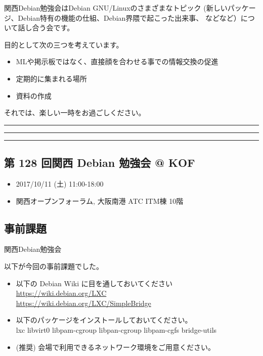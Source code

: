\documentclass[mingoth,a4paper]{jsarticle}
\begin{document}
\vspace{1em}

関西Debian勉強会はDebian GNU/Linuxのさまざまなトピック
(新しいパッケージ、Debian特有の機能の仕組、Debian界隈で起こった出来事、
などなど）について話し合う会です。

目的として次の三つを考えています。
\begin{itemize}
\item MLや掲示板ではなく、直接顔を合わせる事での情報交換の促進
\item 定期的に集まれる場所
\item 資料の作成
\end{itemize}

それでは、楽しい一時をお過ごしください。

\newpage

\begin{minipage}[b]{0.2\hsize}
  {}
\end{minipage}
\begin{minipage}[b]{0.8\hsize}
\hrule
\vspace{2mm}
\hrule
\setcounter{tocdepth}{1}
\tableofcontents
\vspace{2mm}
\hrule
\end{minipage}


\subsection{第 128 回関西 Debian 勉強会 @ KOF}
\begin{itemize}
  \item 2017/10/11 (土) 11:00-18:00 
  \item 関西オープンフォーラム, 大阪南港 ATC ITM棟 10階
\end{itemize}

\subsection{事前課題}{関西Debian勉強会}

以下が今回の事前課題でした。
\begin{itemize}
	\item 以下の Debian Wiki に目を通しておいてください \\
		\url{https://wiki.debian.org/LXC} \\
		\url{https://wiki.debian.org/LXC/SimpleBridge}

    \item 以下のパッケージをインストールしておいてください。 \\
		lxc libvirt0 libpam-cgroup libpan-cgroup libpam-cgfs bridge-utils
	\item (推奨) 会場で利用できるネットワーク環境をご用意ください。
\end{itemize}
\end{document}
